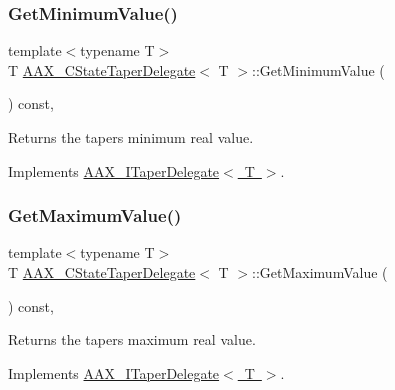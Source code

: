 \subsubsection{\texorpdfstring{GetMinimumValue()}{GetMinimumValue()}}
{\footnotesize\ttfamily template$<$typename T$>$ \\
T \mbox{\hyperlink{a01569}{A\+A\+X\+\_\+\+C\+State\+Taper\+Delegate}}$<$ T $>$\+::Get\+Minimum\+Value (\begin{DoxyParamCaption}{ }\end{DoxyParamCaption}) const\hspace{0.3cm}{\ttfamily [inline]}, {\ttfamily [virtual]}}



Returns the taper\textquotesingle{}s minimum real value. 



Implements \mbox{\hyperlink{a01881_ac51bda25adc6f4ce320c0dd41fa332c7}{A\+A\+X\+\_\+\+I\+Taper\+Delegate$<$ T $>$}}.

\mbox{\label{a01569_aeb4ff10c4750236caa03be5f04c9eaba}} 
\subsubsection{\texorpdfstring{GetMaximumValue()}{GetMaximumValue()}}
{\footnotesize\ttfamily template$<$typename T$>$ \\
T \mbox{\hyperlink{a01569}{A\+A\+X\+\_\+\+C\+State\+Taper\+Delegate}}$<$ T $>$\+::Get\+Maximum\+Value (\begin{DoxyParamCaption}{ }\end{DoxyParamCaption}) const\hspace{0.3cm}{\ttfamily [inline]}, {\ttfamily [virtual]}}



Returns the taper\textquotesingle{}s maximum real value. 



Implements \mbox{\hyperlink{a01881_a9b14f7d73d614b6c012ed03fadb9f0eb}{A\+A\+X\+\_\+\+I\+Taper\+Delegate$<$ T $>$}}.

\mbox{\label{a01569_a6caec4112e24a711c9b7fdefa6384462}} 

